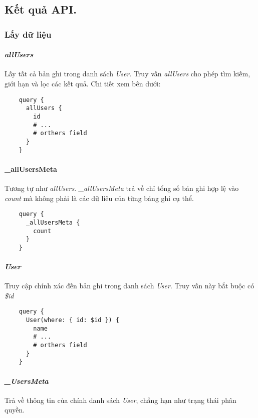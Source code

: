 
\subsection{Kết quả API.}

\subsubsection{Lấy dữ liệu}

\paragraph{\emph{allUsers}}

Lấy tất cả bản ghi trong danh sách \emph{User}. Truy vấn \emph{allUsers} cho phép tìm kiếm, giới hạn và lọc các kết quả. Chi tiết xem bên dưới:

\begin{lstlisting}
	query {
	  allUsers {
	    id
	    # ...
	    # orthers field
	  }
	}
\end{lstlisting}

\paragraph{\_allUsersMeta}

Tương tự như \emph{allUsers}. \emph{\_allUsersMeta} trả về chỉ tổng số bản ghi hợp lệ vào \emph{count} mà không phải là các dữ liêu của từng bảng ghi cụ thể.

\begin{lstlisting}
	query {
	  _allUsersMeta {
	    count
	  }
	}
\end{lstlisting}

\paragraph{\emph{User}}

Truy cập chính xác đến bản ghi trong danh sách \emph{User}. Truy vấn này bắt buộc có \emph{\$id}
\begin{lstlisting}
	query {
	  User(where: { id: $id }) {
	    name
	    # ...
	    # orthers field
	  }
	}
\end{lstlisting}

\paragraph{\emph{\_UsersMeta}}

Trả về thông tin của chính danh sách \emph{User}, chẳng hạn như trạng thái phân quyền.

